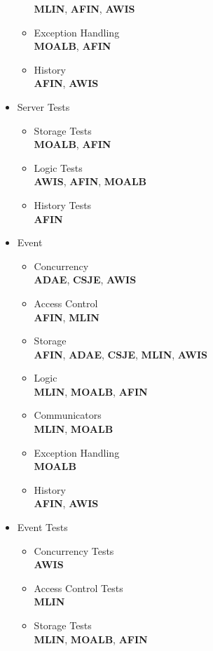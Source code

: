 \begin{itemize}
\begin{itemize}
		\textbf{MLIN}, \textbf{AFIN}, \textbf{AWIS}
		\item Exception Handling\\
		\textbf{MOALB}, \textbf{AFIN}
		\item History\\
		\textbf{AFIN}, \textbf{AWIS}
	\end{itemize}
	\item Server Tests
	\begin{itemize}
		\item Storage Tests\\
		\textbf{MOALB}, \textbf{AFIN}
		\item Logic Tests\\
		\textbf{AWIS}, \textbf{AFIN}, \textbf{MOALB}
		\item History Tests\\
		\textbf{AFIN}
	\end{itemize}
	\item Event
	\begin{itemize}
		\item Concurrency\\
		\textbf{ADAE}, \textbf{CSJE}, \textbf{AWIS}
		\item Access Control\\
		\textbf{AFIN}, \textbf{MLIN}
		\item Storage\\
		\textbf{AFIN}, \textbf{ADAE}, \textbf{CSJE}, \textbf{MLIN}, \textbf{AWIS}
		\item Logic\\
		\textbf{MLIN}, \textbf{MOALB}, \textbf{AFIN} 
		\item Communicators\\
		\textbf{MLIN}, \textbf{MOALB}
		\item Exception Handling\\
		\textbf{MOALB}
		\item History\\
		\textbf{AFIN}, \textbf{AWIS}
	\end{itemize}
	\item Event Tests
	\begin{itemize}
		\item Concurrency Tests\\
		\textbf{AWIS}
		\item Access Control Tests\\
		\textbf{MLIN}
		\item Storage Tests\\
		\textbf{MLIN}, \textbf{MOALB}, \textbf{AFIN}

\end{itemize}
\end{itemize}

